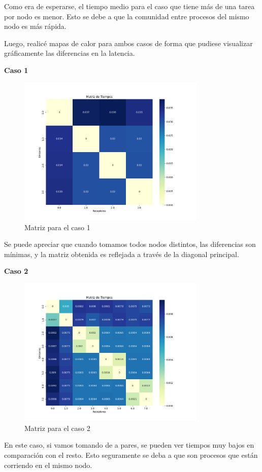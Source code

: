 Como era de esperarse, el tiempo medio para el caso que tiene más de una tarea por nodo es menor. Esto se debe a que la comunidad entre procesos del mismo nodo es más rápida. 

Luego, realicé mapas de calor para ambos casos de forma que pudiese visualizar gráficamente las diferencias en la latencia.

\textbf{Caso 1}
\begin{figure}[H]
    \centering
    \includegraphics[width=0.80\textwidth]{Images/ej2/matriz1.png}
    \caption{Matriz para el caso 1}
    \label{fig:matrizcaso1}
\end{figure}

Se puede apreciar que cuando tomamos todos nodos distintos, las diferencias son mínimas, y la matriz obtenida es reflejada a través de la diagonal principal.

\textbf{Caso 2}
\begin{figure}[H]
    \centering
    \includegraphics[width=0.80\textwidth]{Images/ej2/matriz2.png}
    \caption{Matriz para el caso 2}
    \label{fig:matrizcaso2}
\end{figure}

En este caso, si vamos tomando de a pares, se pueden ver tiempos muy bajos en comparación con el resto. Esto seguramente se deba a que son procesos que están corriendo en el mismo nodo.